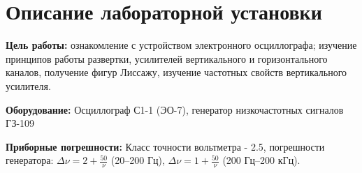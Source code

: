 
\newcommand{\labauthor}{Сарафанов Ф.\,Г.}
\newcommand{\labauthors}{Сарафанов Ф.\,Г.}
\newcommand{\labnumber}{17}
\newcommand{\labtheme}{Осциллограф}


\newcommand{\ddt}{$\ \pm\ 0.2\ \text{с}$}
\newcommand{\ddtv}{$\ \pm\ 0.8\ \text{с}$}
\newcommand{\ddh}{$\ \pm\ 0.1\ \text{см}$}
\newcommand{\dm}{\Delta{}m}
\newcommand{\Dh}{\Delta{}x}
\newcommand{\Dl}{\Delta{}(\lambda)}
\newcommand{\dmsr}{<\Delta{}m>}
\newcommand{\el}{\varepsilon(\lambda)}

\usetikzlibrary{%
    decorations.pathreplacing,%
    decorations.pathmorphing,%
    arrows,%
    patterns
}
\newcommand{\Scale}{1}
\newcommand{\lft}{9}
\newcommand{\rft}{10.43*1.5}
\newcommand{\Xstep}{1.5}
\newcommand{\Ystep}{1.5*20}
\newcommand{\Radius}{0.1}
\newcommand{\Color}{black}







\tableofcontents

\newpage
\section{Описание лабораторной установки}

\textbf{Цель работы:} ознакомление с устройством электронного осциллографа; изучение принципов работы развертки, усилителей вертикального и горизонтального каналов, получение фигур Лиссажу, изучение частотных свойств вертикального усилителя.
\vspace{1.5em}

\textbf{Оборудование:}
Осциллограф С1-1 (ЭО-7), генератор низкочастотных сигналов ГЗ-109
\vspace{1.5em}

\textbf{Приборные погрешности:} Класс точности вольтметра - 2.5, погрешности генератора: $\Delta{\nu}=2+\frac{50}{\nu}$ (20--200 Гц), $\Delta{\nu}=1+\frac{50}{\nu}$ (200 Гц--200 кГц).
\vspace{1.5em}

